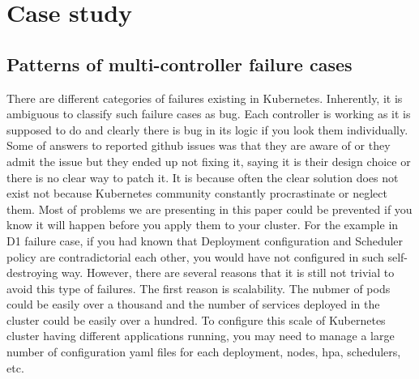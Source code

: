 \section{Case study}
\label{sec:case_study}
\subsection*{Patterns of multi-controller failure cases}
There are different categories of failures existing in Kubernetes. Inherently, it is ambiguous to classify such failure cases as bug. Each controller is working as it is supposed to do and clearly there is bug in its logic if you look them individually. Some of answers to reported github issues was that they are aware of or they admit the issue but they ended up not fixing it, saying it is their design choice or there is no clear way to patch it. It is because often the clear solution does not exist not because Kubernetes community constantly procrastinate or neglect them. Most of problems we are presenting in this paper could be prevented if you know it will happen before you apply them to your cluster. For the example in D1 failure case, if you had known that Deployment configuration and Scheduler policy are contradictorial each other, you would have not configured in such self-destroying way. However, there are several reasons that it is still not trivial to avoid this type of failures. The first reason is scalability. The nubmer of pods could be easily over a thousand and the number of services deployed in the cluster could be easily over a hundred. To configure this scale of Kubernetes cluster having different applications running, you may need to manage a large number of configuration yaml files for each deployment, nodes, hpa, schedulers, etc. 

